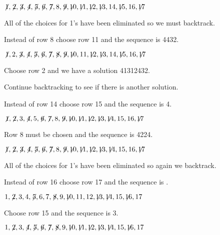$\not\! 1,\not\! 2,\not\! 3,\not\! 4,\not\! 5,\not\! 6,\not\! 7,8,\not\! 9,\not\!\! 10,\not\!\! 11,\not\!\! 12,\not\!\! 13,14, \not\!\! 15,16,\not\!\! 17$

\noindent All of the choices for 1's have been eliminated so we must backtrack.

\smallskip

\noindent Instead of row 8 choose row 11 and the sequence is 44{}3{}2.


$\not\! 1,2,\not\! 3,\not\! 4,\not\! 5,\not\! 6,\not\! 7,\not\! 8,\not\! 9,\not\!\! 10,11,\not\!\! 12,\not\!\! 13,14, \not\!\! 15,16,\not\!\! 17$

\noindent Choose row 2 and we have a solution 4{}1{}3{}1{}2{}4{}3{}2.

\smallskip

\noindent Continue backtracking to see if there is another solution.

\smallskip

\noindent Instead of row 14 choose row 15 and the sequence is 4\textvisiblespace {}.

$\not\! 1,\not\! 2,3,\not\! 4,5,\not\! 6,\not\! 7,8,\not\! 9,\not\!\! 10,\not\!\! 11,\not\!\! 12,\not\!\! 13,\not\!\! 14,15,16,\not\!\! 17$

\newpage

\noindent Row 8 must be chosen and the sequence is 4{}22{}4.

$\not\! 1,\not\! 2,\not\! 3,\not\! 4,\not\! 5,\not\! 6,\not\! 7,8,\not\! 9,\not\!\! 10,\not\!\! 11,\not\!\! 12,\not\!\! 13,\not\!\! 14,15,16,\not\!\! 17$

\noindent All of the choices for 1's have been eliminated so again we backtrack.

\smallskip

\noindent Instead of row 16 choose row 17 and the sequence is \textvisiblespace \textvisiblespace \textvisiblespace{}\textvisiblespace.

$1,\not\! 2,3,4,\not\! 5,6,7,\not\! 8,9,\not\!\! 10,11,12,\not\!\! 13,\not\!\! 14,15,\not\!\! 16,17$

\noindent Choose row 15 and the sequence is \textvisiblespace{}3.

$1,\not\! 2,3,\not\! 4,\not\! 5,\not\! 6,\not\! 7,\not\! 8,9,\not\!\! 10,\not\!\! 11,\not\!\! 12,\not\!\! 13,\not\!\! 14,15,\not\!\! 16,17$

